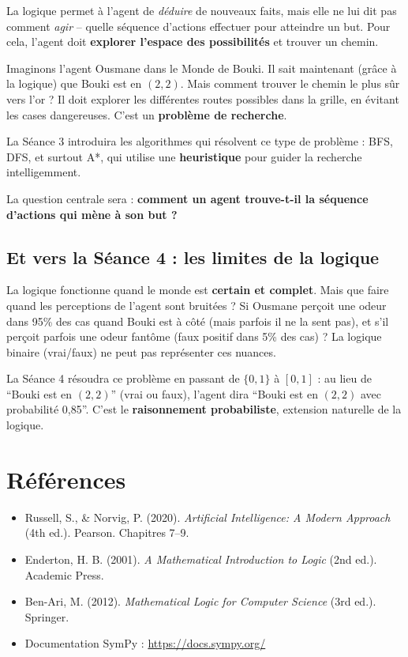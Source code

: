\documentclass[11pt,a4paper]{article}
\begin{document}
La logique permet à l'agent de \textit{déduire} de nouveaux faits, mais elle ne lui dit pas comment \textit{agir} -- quelle séquence d'actions effectuer pour atteindre un but. Pour cela, l'agent doit \textbf{explorer l'espace des possibilités} et trouver un chemin.

Imaginons l'agent Ousmane dans le Monde de Bouki. Il sait maintenant (grâce à la logique) que Bouki est en $(2,2)$. Mais comment trouver le chemin le plus sûr vers l'or ? Il doit explorer les différentes routes possibles dans la grille, en évitant les cases dangereuses. C'est un \textbf{problème de recherche}.

La Séance 3 introduira les algorithmes qui résolvent ce type de problème : BFS, DFS, et surtout A*, qui utilise une \textbf{heuristique} pour guider la recherche intelligemment.

La question centrale sera : \textbf{comment un agent trouve-t-il la séquence d'actions qui mène à son but ?}

\subsection{Et vers la Séance 4 : les limites de la logique}

La logique fonctionne quand le monde est \textbf{certain et complet}. Mais que faire quand les perceptions de l'agent sont bruitées ? Si Ousmane perçoit une odeur dans 95\% des cas quand Bouki est à côté (mais parfois il ne la sent pas), et s'il perçoit parfois une odeur fantôme (faux positif dans 5\% des cas) ? La logique binaire (vrai/faux) ne peut pas représenter ces nuances.

La Séance 4 résoudra ce problème en passant de $\{0, 1\}$ à $[0, 1]$ : au lieu de ``Bouki est en $(2,2)$'' (vrai ou faux), l'agent dira ``Bouki est en $(2,2)$ avec probabilité 0,85''. C'est le \textbf{raisonnement probabiliste}, extension naturelle de la logique.

\section*{Références}

\begin{itemize}
    \item Russell, S., \& Norvig, P. (2020). \textit{Artificial Intelligence: A Modern Approach} (4th ed.). Pearson. Chapitres 7--9.
    \item Enderton, H. B. (2001). \textit{A Mathematical Introduction to Logic} (2nd ed.). Academic Press.
    \item Ben-Ari, M. (2012). \textit{Mathematical Logic for Computer Science} (3rd ed.). Springer.
    \item Documentation SymPy : \url{https://docs.sympy.org/}
\end{itemize}
\end{document}
